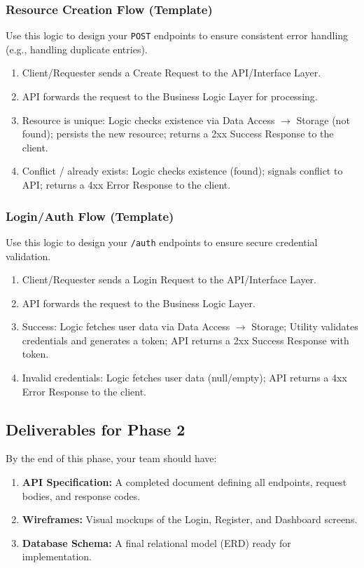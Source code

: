\subsubsection{Resource Creation Flow (Template)}
Use this logic to design your \texttt{POST} endpoints to ensure consistent error handling
(e.g., handling duplicate entries).
\begin{enumerate}[label=\arabic*., nosep, leftmargin=*]
  \item Client/Requester sends a Create Request to the API/Interface Layer.
  \item API forwards the request to the Business Logic Layer for processing.
  \item[\textbf{A.}] Resource is unique: Logic checks existence via Data Access $\rightarrow$ Storage (not found); persists the new resource; returns a 2xx Success Response to the client.
  \item[\textbf{B.}] Conflict / already exists: Logic checks existence (found); signals conflict to API; returns a 4xx Error Response to the client.
\end{enumerate}

\subsubsection{Login/Auth Flow (Template)}
Use this logic to design your \texttt{/auth} endpoints to ensure secure credential validation.
\begin{enumerate}[label=\arabic*., nosep, leftmargin=*]
  \item Client/Requester sends a Login Request to the API/Interface Layer.
  \item API forwards the request to the Business Logic Layer.
  \item[\textbf{A.}] Success: Logic fetches user data via Data Access $\rightarrow$ Storage; Utility validates credentials and generates a token; API returns a 2xx Success Response with token.
  \item[\textbf{B.}] Invalid credentials: Logic fetches user data (null/empty); API returns a 4xx Error Response to the client.
\end{enumerate}

\subsection{Deliverables for Phase 2}
By the end of this phase, your team should have:
\begin{enumerate}
  \item \textbf{API Specification:} A completed document defining all endpoints, request bodies, and response codes.
  \item \textbf{Wireframes:} Visual mockups of the Login, Register, and Dashboard screens.
  \item \textbf{Database Schema:} A final relational model (ERD) ready for implementation.
\end{enumerate}

